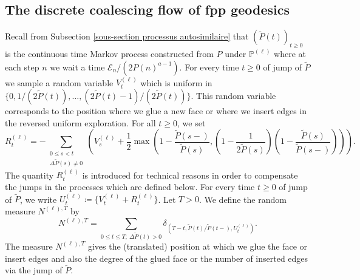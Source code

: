 \documentclass[11pt]{article}
\numberwithin{equation}{section}
\def\P{\mathbb{P}}
\begin{document}
\subsection{The discrete coalescing flow of fpp geodesics}\label{sous-section flot coalescent discret}
Recall {from Subsection \ref{sous-section processus autosimilaire}} that $(\widetilde{P}(t))_{t\ge 0}$ is the continuous time Markov process constructed from $P$ under $\P^{(\ell)}$ where at each step $n$ we wait a time $\mathcal{E}_n/{(2P(n)^{a-1})}$. For every time $t \ge0$ of jump of $\widetilde{P}$ we sample a random variable $V^{(\ell)}_t$ which is uniform in $\{0,1/(2\widetilde{P}(t)),  \ldots, (2\widetilde{P}(t)-1)/(2\widetilde{P}(t))\}$. This random variable corresponds to the position where we glue a new face or where we insert edges in the reversed uniform exploration. 
For all $t\ge 0$, we set
$$
R^{(\ell)}_t = 
-\sum_{\substack{0\le s <t \\ \Delta \widetilde{P}(s) \neq 0}} \left(V^{(\ell)}_s +\frac{1}{2} \max\left(1-\frac{\widetilde{P}(s-)}{\widetilde{P}(s)}, \left(1-\frac{1}{2\widetilde{P}(s)} \right)\left(1-\frac{\widetilde{P}(s)}{\widetilde{P}(s-)}\right) \right)
\right).
$$ 
The quantity $R^{(\ell)}_t$ is introduced for technical reasons in order to compensate the jumps in the processes which are defined below. For every time $t\ge 0$ of jump of $\widetilde{P}$, we write $U^{(\ell)}_t \coloneqq \{V^{(\ell)}_t+ R^{(\ell)}_t\}$. Let $T>0$. 
We define the random measure $N^{(\ell),T}$ by
$$
N^{(\ell),T} = \sum_{0 \le t\le T; \ \Delta \widetilde{P}(t)>0}
\delta_{(T-t,\widetilde{P}(t)/\widetilde{P}(t-), U^{(\ell)}_t )}.
$$
The measure $N^{(\ell),T}$ gives the (translated) position at which we glue the face or insert edges and also the degree of the glued face or the number of inserted edges via the jump of $\widetilde{P}$.
\end{document}
